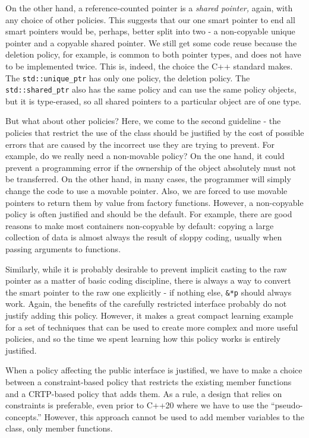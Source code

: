 On the other hand, a reference-counted pointer is a \emph{shared pointer,} again, with any choice of other policies. This suggests that our one smart pointer to end all smart pointers would be, perhaps, better split into two - a non-copyable unique pointer and a copyable shared pointer. We still get some code reuse because the deletion policy, for example, is common to both pointer types, and does not have to be implemented twice. This is, indeed, the choice the C++ standard makes. The \texttt{std::unique\_ptr} has only one policy, the deletion policy. The \texttt{std::shared\_ptr} also has the same policy and can use the same policy objects, but it is type-erased, so all shared pointers to a particular object are of one type.

But what about other policies? Here, we come to the second guideline - the policies that restrict the use of the class should be justified by the cost of possible errors that are caused by the incorrect use they are trying to prevent. For example, do we really need a non-movable policy? On the one hand, it could prevent a programming error if the ownership of the object absolutely must not be transferred. On the other hand, in many cases, the programmer will simply change the code to use a movable pointer. Also, we are forced to use movable pointers to return them by value from factory functions. However, a non-copyable policy is often justified and should be the default. For example, there are good reasons to make most containers non-copyable by default: copying a large collection of data is almost always the result of sloppy coding, usually when passing arguments to functions.

Similarly, while it is probably desirable to prevent implicit casting to the raw pointer as a matter of basic coding discipline, there is always a way to convert the smart pointer to the raw one explicitly - if nothing else, \texttt{\&*p} should always work. Again, the benefits of the carefully restricted interface probably do not justify adding this policy. However, it makes a great compact learning example for a set of techniques that can be used to create more complex and more useful policies, and so the time we spent learning how this policy works is entirely justified.

When a policy affecting the public interface is justified, we have to make a choice between a constraint-based policy that restricts the existing member functions and a CRTP-based policy that adds them. As a rule, a design that relies on constraints is preferable, even prior to C++20 where we have to use the ``pseudo-concepts.'' However, this approach cannot be used to add member variables to the class, only member functions.

